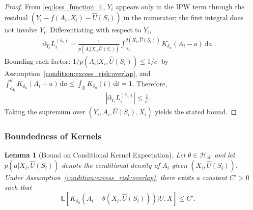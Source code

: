 \documentclass[12pt]{article}
\newtheorem{lemma}{Lemma}%
\newcommand{\E}{\mathbb{E}}
\newcommand{\R}{\mathbb{R}}
\begin{document}
\begin{proof}
From \eqref{eq:loss_function_i}, $Y_i$ appears only in the IPW term through the residual $(Y_i-f(A_i,X_i)-\widehat U(S_i))$ in the numerator; the first integral does not involve $Y_i$.  Differentiating with respect to $Y_i$,
\begin{align*}
\partial_{Y_i}L^{(\delta_n)}_i
= \frac{1}{p(A_i|X_i,\widehat U(S_i))}\int_{a_L}^{\theta(X_i,\widehat U(S_i))}K_{\delta_n}(A_i-a)\,\mathrm{d}a.
\end{align*}
Bounding each factor: $1/p(A_i|X_i,\widehat U(S_i))\leq 1/c^\prime$ by Assumption~\ref{condition:excess_risk:overlap}, and $\int_{a_L}^{\theta}K_{\delta_n}(A_i-a)\,\mathrm{d}a\leq\int_\R K_{\delta_n}(t)\,\mathrm{d}t=1$.  Therefore,
\begin{align*}
\left|\partial_{Y_i}L^{(\delta_n)}_i\right| \leq \frac{1}{c^\prime}.
\end{align*}
Taking the supremum over $(Y_i,A_i,\widehat{U}(S_i),X_i)$ yields the stated bound.
\end{proof}

\subsubsection{Boundedness of Kernels}

\begin{lemma}[Bound on Conditional Kernel Expectation]\label{lemma:kernel_exp_bound}
Let $\theta\in\mathcal{H}_\mathcal{K}$ and let $p(a|X_i,\widehat{U}(S_i))$ denote the conditional density of $A_i$ given $(X_i,\widehat{U}(S_i))$. Under Assumption~\ref{condition:excess_risk:overlap}, there exists a constant $C'>0$ such that
$$\E\!\left[K_{\delta_n}\!\left(A_i - \theta(X_i,\widehat{U}(S_i))\right)\bigg|U,X\right] \leq C'.$$
\end{lemma}
\end{document}
